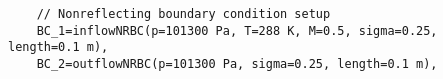 \documentclass{article}
\begin{document}
\begin{list}{}{}
\begin{verbatim}
    // Nonreflecting boundary condition setup
    BC_1=inflowNRBC(p=101300 Pa, T=288 K, M=0.5, sigma=0.25, length=0.1 m),
    BC_2=outflowNRBC(p=101300 Pa, sigma=0.25, length=0.1 m),
\end{verbatim}


  \end{list}


\clearpage





\end{document}
